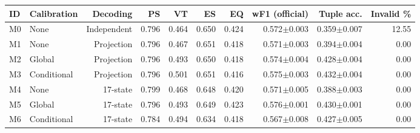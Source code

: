 \begin{tabular}{llrrrrrrrr}
\toprule
ID & Calibration & Decoding & PS & VT & ES & EQ & wF1 (official) & Tuple acc. & Invalid \% \\
\midrule
M0 & None & Independent & 0.796 & 0.464 & 0.650 & 0.424 & 0.572$\pm$0.003 & 0.359$\pm$0.007 & 12.55 \\
M1 & None & Projection & 0.796 & 0.467 & 0.651 & 0.418 & 0.571$\pm$0.003 & 0.394$\pm$0.004 & 0.00 \\
M2 & Global & Projection & 0.796 & 0.493 & 0.650 & 0.418 & 0.574$\pm$0.004 & 0.428$\pm$0.004 & 0.00 \\
M3 & Conditional & Projection & 0.796 & 0.501 & 0.651 & 0.416 & 0.575$\pm$0.003 & 0.432$\pm$0.004 & 0.00 \\
M4 & None & 17-state & 0.799 & 0.468 & 0.648 & 0.420 & 0.571$\pm$0.005 & 0.388$\pm$0.003 & 0.00 \\
M5 & Global & 17-state & 0.796 & 0.493 & 0.649 & 0.423 & 0.576$\pm$0.001 & 0.430$\pm$0.001 & 0.00 \\
M6 & Conditional & 17-state & 0.784 & 0.494 & 0.634 & 0.418 & 0.567$\pm$0.008 & 0.427$\pm$0.005 & 0.00 \\
\bottomrule
\end{tabular}
